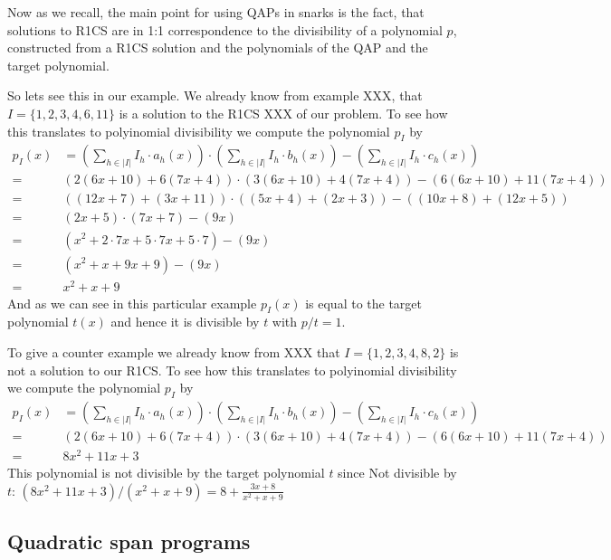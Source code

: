 \begin{example}
Now as we recall, the main point for using QAPs in snarks is the fact, that solutions to R1CS are in 1:1 correspondence to the divisibility of a polynomial $p$, constructed from a R1CS solution and the polynomials of the QAP and the target polynomial.

So lets see this in our example. We already know from example XXX, that 
$I=\{1,2,3,4,6,11\}$ is a solution to the R1CS XXX of our problem. To see how this translates to polyinomial divisibility we compute the polynomial $p_I$ by
\begin{align*}
p_I(x)& = (\sum_{h\in |I|} I_h\cdot a_h(x))\cdot 
(\sum_{h\in |I|} I_h\cdot b_h(x)) - 
(\sum_{h\in |I|} I_h\cdot c_h(x)) \\
= & (2(6x+10)+6(7x+4))\cdot(3(6x+10)+4(7x+4))-(6(6x+10)+11(7x+4)) \\
= & ((12x+7)+(3x+11))\cdot((5x+4)+(2x+3))-((10x+8)+(12x+5)) \\
= & (2x+5)\cdot(7x+7)-(9x) \\
= & (x^{2}+2\cdot7x+5\cdot7x+5\cdot7)-(9x) \\
= & (x^{2}+x+9x+9)-(9x) \\
= & x^{2}+x+9
\end{align*}
And as we can see in this particular example $p_I(x)$ is equal to the target polynomial $t(x)$ and hence it is divisible by $t$ with $p/t=1$.

To give a counter example we already know from XXX that $I=\{1,2,3,4,8, 2\}$ is not a solution to our R1CS. To see how this translates to polyinomial divisibility we compute the polynomial $p_I$ by
\begin{align*}
p_I(x)& = (\sum_{h\in |I|} I_h\cdot a_h(x))\cdot 
(\sum_{h\in |I|} I_h\cdot b_h(x)) - 
(\sum_{h\in |I|} I_h\cdot c_h(x)) \\
= & (2(6x+10)+6(7x+4))\cdot(3(6x+10)+4(7x+4))-(6(6x+10)+11(7x+4)) \\
= & 8x^{2}+11x+3
\end{align*}
This polynomial is not divisible by the target polynomial $t$ since
Not divisible by $t$: $(8x^{2}+11x+3)/(x^{2}+x+9) =8+\frac{3x+8}{x^{2}+x+9} $
\end{example}


\subsection{Quadratic span programs}

